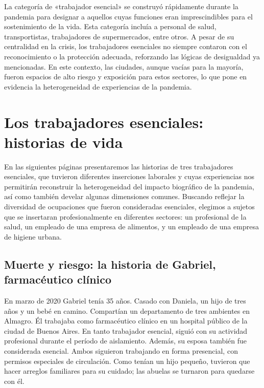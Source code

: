\begin{refsection}
La categoría de «trabajador esencial» se construyó rápidamente durante la pandemia para designar a aquellos cuyas funciones eran imprescindibles para el sostenimiento de la vida. Esta categoría incluía a personal de salud, transportistas, trabajadores de supermercados, entre otros. A pesar de su centralidad en la crisis, los trabajadores esenciales no siempre contaron con el reconocimiento o la protección adecuada, reforzando las lógicas de desigualdad ya mencionadas. En este contexto, las ciudades, aunque vacías para la mayoría, fueron espacios de alto riesgo y exposición para estos sectores, lo que pone en evidencia la heterogeneidad de experiencias de la pandemia.


\section[Los trabajadores esenciales: historias de vida]{Los trabajadores esenciales: historias de vida}
\label{cap-29.los-trabajadores-esenciales-historias-de-vida}
En las siguientes páginas presentaremos las historias de tres trabajadores esenciales, que tuvieron diferentes inserciones laborales y cuyas experiencias nos permitirán reconstruir la heterogeneidad del impacto biográfico de la pandemia, así como también develar algunas dimensiones comunes. Buscando reflejar la diversidad de ocupaciones que fueron consideradas esenciales, elegimos a sujetos que se insertaran profesionalmente en diferentes sectores: un profesional de la salud, un empleado de una empresa de alimentos, y un empleado de una empresa de higiene urbana.


\subsection[Muerte y riesgo: la historia de Gabriel, farmacéutico clínico]{Muerte y riesgo: la historia de Gabriel, farmacéutico clínico}
\label{cap-29.muerte-y-riesgo-la-historia-de-gabriel-farmaceutico-clinico}
En marzo de 2020 Gabriel tenía 35 años. Casado con Daniela, un hijo de tres años y un bebé en camino. Compartían un departamento de tres ambientes en Almagro. Él trabajaba como farmacéutico clínico en un hospital público de la ciudad de Buenos Aires. En tanto trabajador esencial, siguió con su actividad profesional durante el período de aislamiento. Además, su esposa también fue considerada esencial. Ambos siguieron trabajando en forma presencial, con permisos especiales de circulación. Como tenían un hijo pequeño, tuvieron que hacer arreglos familiares para su cuidado; las abuelas se turnaron para quedarse con él.


\end{refsection}
